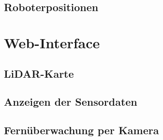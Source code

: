 \documentclass[12pt]{article}
\begin{document}
	\subsection{Roboterpositionen}
	\section{Web-Interface}
	\subsection{LiDAR-Karte}
	\subsection{Anzeigen der Sensordaten}
	\subsection{Fernüberwachung per Kamera}

	\newpage
	\begin{appendix}
		\listoffigures
		\listoftables
	\end{appendix}
	\vspace{1cm}
\end{document}
